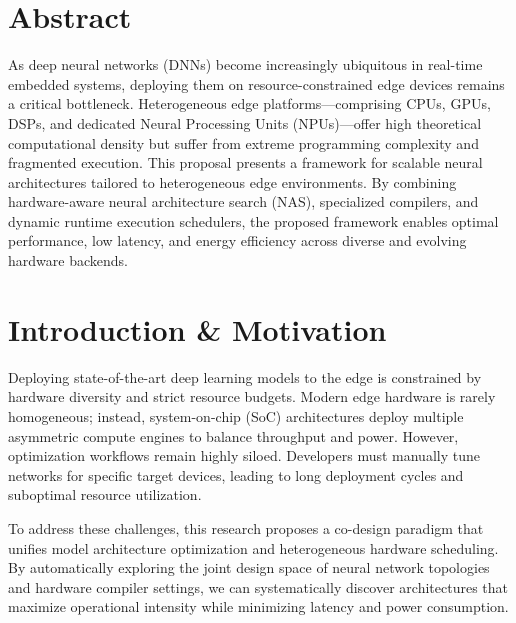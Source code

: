 \documentclass[11pt,a4paper]{article}
\begin{document}
\newpage
{} %


\section{Abstract}
As deep neural networks (DNNs) become increasingly ubiquitous in real-time embedded systems, deploying them on resource-constrained edge devices remains a critical bottleneck. Heterogeneous edge platforms—comprising CPUs, GPUs, DSPs, and dedicated Neural Processing Units (NPUs)—offer high theoretical computational density but suffer from extreme programming complexity and fragmented execution. This proposal presents a framework for scalable neural architectures tailored to heterogeneous edge environments. By combining hardware-aware neural architecture search (NAS), specialized compilers, and dynamic runtime execution schedulers, the proposed framework enables optimal performance, low latency, and energy efficiency across diverse and evolving hardware backends.

\section{Introduction \& Motivation}
Deploying state-of-the-art deep learning models to the edge is constrained by hardware diversity and strict resource budgets. Modern edge hardware is rarely homogeneous; instead, system-on-chip (SoC) architectures deploy multiple asymmetric compute engines to balance throughput and power. However, optimization workflows remain highly siloed. Developers must manually tune networks for specific target devices, leading to long deployment cycles and suboptimal resource utilization. 

To address these challenges, this research proposes a co-design paradigm that unifies model architecture optimization and heterogeneous hardware scheduling. By automatically exploring the joint design space of neural network topologies and hardware compiler settings, we can systematically discover architectures that maximize operational intensity while minimizing latency and power consumption.
\end{document}
